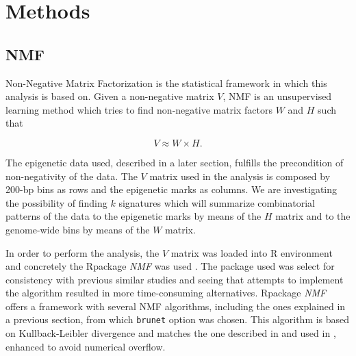 
\chapter{Methods}\label{Methods} %


\section{NMF}

Non-Negative Matrix Factorization is the statistical framework in which this analysis is based on. Given a non-negative matrix \(V\), NMF is an unsupervised learning method which tries to find non-negative matrix factors \(W\) and \(H\) such that

\begin{equation}
     V \approx W \times H.
\end{equation}

The epigenetic data used, described in a later section, fulfills the precondition of non-negativity of the data. The \(V\) matrix used in the analysis is composed by 200-bp bins as rows and the epigenetic marks as columns. We are investigating the possibility of finding \(k\) signatures which will summarize combinatorial patterns of the data to the epigenetic marks by means of the \(H\) matrix and to the genome-wide bins by means of the \(W\) matrix.

\medskip

In order to perform the analysis, the \(V\) matrix was loaded into R environment and concretely the Rpackage \textit{NMF} was used \cite{Gaujoux2010}. The package used was select for consistency with previous similar studies \cite{Gandolfi2017} and seeing that attempts to implement the algorithm resulted in more time-consuming alternatives. Rpackage \textit{NMF} offers a framework with several NMF algorithms, including the ones explained in a previous section, from which \texttt{brunet} option was chosen. This algorithm is based on Kullback-Leibler divergence and matches the one described in \cite{Lee2001} and used in \cite{Brunet2004}, enhanced to avoid numerical overflow.

